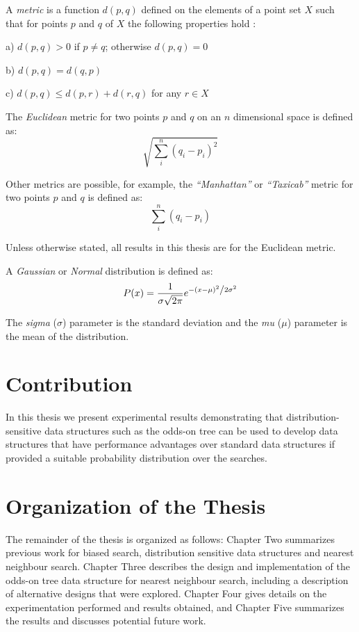 \documentclass[mcs]{scsthesis}
\begin{document}
A \emph{metric} is a function \(d(p,q)\) defined on the elements of a point set
\(X\) such that for points \(p\) and \(q\) of \(X\) the following properties
hold \cite{rudin}:

a) \(d(p,q) > 0\) if \(p \ne q\); otherwise \(d(p, q) = 0\)

b) \(d(p,q) = d(q, p)\)

c) \(d(p,q) \le d(p, r) + d(r, q)\) for any \(r \in X\) 

The \emph{Euclidean} metric for two points \(p\) and \(q\) on an \(n\)
dimensional space is defined as:
$$
\sqrt{\sum_i^n{(q_i-p_i)^2}}
$$

Other metrics are possible, for example, the \emph{``Manhattan''} or
\emph{``Taxicab''} metric for two points \(p\) and \(q\) is defined as:
$$
\sum_i^n{(q_i-p_i)}
$$

Unless otherwise stated, all results in this thesis are for the Euclidean
metric.

A \emph{Gaussian} or \emph{Normal} distribution is defined as:
$$
P(x) = \frac{1}{{\sigma \sqrt {2\pi } }}e^{{{ - \left( {x - \mu } \right)^2 } \mathord{\left/ {\vphantom {{ - \left( {x - \mu } \right)^2 } {2\sigma ^2 }}} \right. \kern-\nulldelimiterspace} {2\sigma ^2 }}}
$$

The \emph{sigma} (\(\sigma\)) parameter is the standard deviation and the
\emph{mu} (\(\mu\)) parameter is the mean of the distribution.
 
\section{Contribution}

In this thesis we present experimental results demonstrating that
distribution-sensitive data structures such as the odds-on tree can be used to
develop data structures that have performance advantages over standard data
structures if provided a suitable probability distribution over the searches.

\section{Organization of the Thesis}

The remainder of the thesis is organized as follows: Chapter Two summarizes
previous work for biased search, distribution sensitive data structures and
nearest neighbour search.  Chapter Three describes the design and implementation
of the odds-on tree data structure for nearest neighbour search, including a
description of alternative designs that were explored. Chapter Four gives
details on the experimentation performed and results obtained, and Chapter Five
summarizes the results and discusses potential future work.
\end{document}
